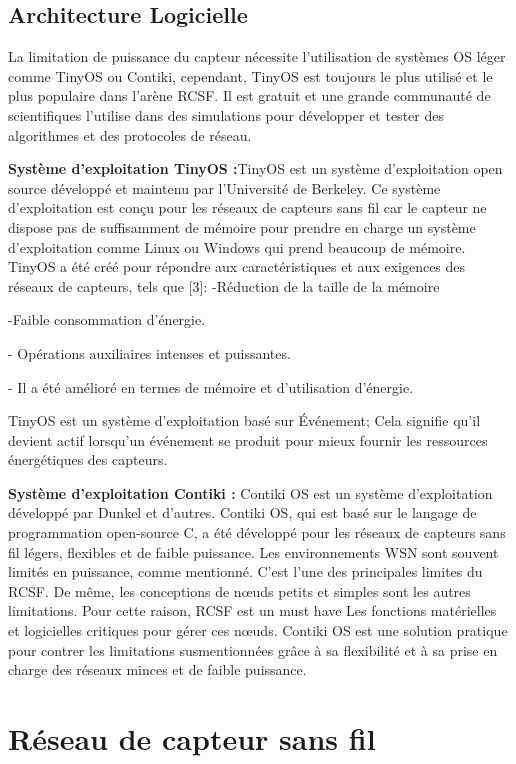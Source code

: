\documentclass[paper=a4, fontsize=11pt]{scrartcl}
\numberwithin{equation}{section}		%
\numberwithin{figure}{section}			%
\numberwithin{table}{section}				%
\begin{document}
\subsection{Architecture Logicielle}
La limitation de puissance du capteur nécessite l'utilisation de systèmes OS léger
comme TinyOS ou Contiki, cependant, TinyOS est toujours le plus utilisé et le plus
populaire dans l'arène RCSF. Il est gratuit et une grande communauté de
scientifiques l'utilise dans des simulations pour développer et tester des algorithmes
et des protocoles de réseau.\par
\textbf{ Système d'exploitation TinyOS :}TinyOS est un système d'exploitation open source développé et maintenu par
l'Université de Berkeley. Ce système d'exploitation est conçu pour les réseaux de
capteurs sans fil car le capteur ne dispose pas de suffisamment de mémoire pour
prendre en charge un système d'exploitation comme Linux ou Windows qui prend
beaucoup de mémoire.
TinyOS a été créé pour répondre aux caractéristiques et aux exigences des réseaux
de capteurs, tels que [3]:
-Réduction de la taille de la mémoire\par
-Faible consommation d'énergie.\par
- Opérations auxiliaires intenses et puissantes.\par
- Il a été amélioré en termes de mémoire et d'utilisation d'énergie.\par
TinyOS est un système d'exploitation basé sur
Événement; Cela signifie qu'il devient actif lorsqu'un événement se produit pour
mieux fournir les ressources énergétiques des capteurs.\par
\textbf{ Système d'exploitation Contiki :}
Contiki OS est un système d'exploitation développé par Dunkel et d'autres. Contiki
OS, qui est basé sur le langage de programmation open-source C, a été développé
pour les réseaux de capteurs sans fil légers, flexibles et de faible puissance.
Les environnements WSN sont souvent limités en puissance, comme mentionné.
C'est l'une des principales limites du RCSF. De même, les conceptions de nœuds
petits et simples sont les autres limitations. Pour cette raison, RCSF est un must have
Les fonctions matérielles et logicielles critiques pour gérer ces nœuds. Contiki OS
est une solution pratique pour contrer les limitations susmentionnées grâce à sa
flexibilité et à sa prise en charge des réseaux minces et de faible puissance.\par
\section{ Réseau de capteur sans fil}
\end{document}
